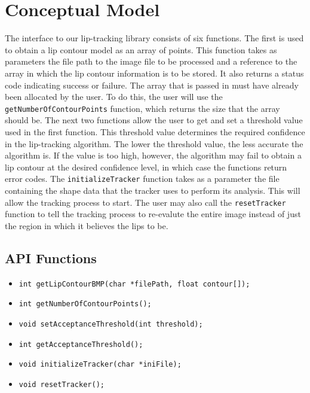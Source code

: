 \chapter{Conceptual Model}

The interface to our lip-tracking library consists of six functions. The first is used to obtain a lip contour model as an array of points. This function takes as parameters the file path to the image file to be processed and a reference to the array in which the lip contour information is to be stored. It also returns a status code indicating success or failure. The array that is passed in must have already been allocated by the user. To do this, the user will use the \texttt{getNumberOfContourPoints} function, which returns the size that the array should be. The next two functions allow the user to get and set a threshold value used in the first function. This threshold value determines the required confidence in the lip-tracking algorithm. The lower the threshold value, the less accurate the algorithm is. If the value is too high, however, the algorithm may fail to obtain a lip contour at the desired confidence level, in which case the functions return error codes. The \texttt{initializeTracker} function takes as a parameter the file containing the shape data that the tracker uses to perform its analysis. This will allow the tracking process to start. The user may also call the \texttt{resetTracker} function to tell the tracking process to re-evalute the entire image instead of just the region in which it believes the lips to be.

\section{API Functions}
\begin{itemize}
\item \texttt{int getLipContourBMP(char *filePath, float contour[]);}
\item \texttt{int getNumberOfContourPoints();}
\item \texttt{void setAcceptanceThreshold(int threshold);}
\item \texttt{int getAcceptanceThreshold();}
\item \texttt{void initializeTracker(char *iniFile);}
\item \texttt{void resetTracker();}
\end{itemize}